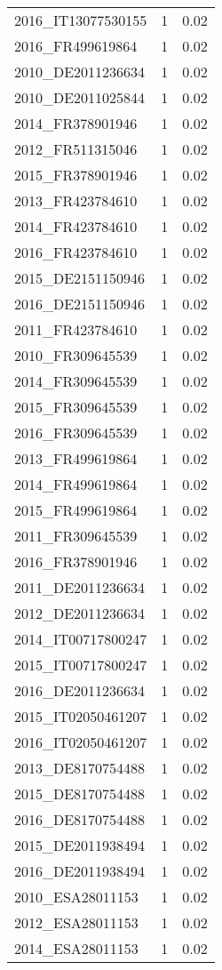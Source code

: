 \begin{table*}[htbp]
\begin{tabular}{lrr}
2016_IT13077530155 & 1 & 0.02 \\
2016_FR499619864 & 1 & 0.02 \\
2010_DE2011236634 & 1 & 0.02 \\
2010_DE2011025844 & 1 & 0.02 \\
2014_FR378901946 & 1 & 0.02 \\
2012_FR511315046 & 1 & 0.02 \\
2015_FR378901946 & 1 & 0.02 \\
2013_FR423784610 & 1 & 0.02 \\
2014_FR423784610 & 1 & 0.02 \\
2016_FR423784610 & 1 & 0.02 \\
2015_DE2151150946 & 1 & 0.02 \\
2016_DE2151150946 & 1 & 0.02 \\
2011_FR423784610 & 1 & 0.02 \\
2010_FR309645539 & 1 & 0.02 \\
2014_FR309645539 & 1 & 0.02 \\
2015_FR309645539 & 1 & 0.02 \\
2016_FR309645539 & 1 & 0.02 \\
2013_FR499619864 & 1 & 0.02 \\
2014_FR499619864 & 1 & 0.02 \\
2015_FR499619864 & 1 & 0.02 \\
2011_FR309645539 & 1 & 0.02 \\
2016_FR378901946 & 1 & 0.02 \\
2011_DE2011236634 & 1 & 0.02 \\
2012_DE2011236634 & 1 & 0.02 \\
2014_IT00717800247 & 1 & 0.02 \\
2015_IT00717800247 & 1 & 0.02 \\
2016_DE2011236634 & 1 & 0.02 \\
2015_IT02050461207 & 1 & 0.02 \\
2016_IT02050461207 & 1 & 0.02 \\
2013_DE8170754488 & 1 & 0.02 \\
2015_DE8170754488 & 1 & 0.02 \\
2016_DE8170754488 & 1 & 0.02 \\
2015_DE2011938494 & 1 & 0.02 \\
2016_DE2011938494 & 1 & 0.02 \\
2010_ESA28011153 & 1 & 0.02 \\
2012_ESA28011153 & 1 & 0.02 \\
2014_ESA28011153 & 1 & 0.02 \\

\end{tabular}
\end{table*}
